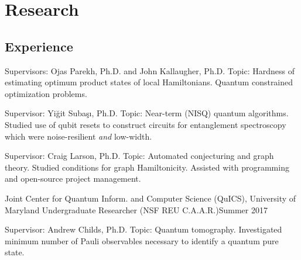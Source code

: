 \documentclass[11pt,letterpaper,serif]{moderncv}
\begin{document}
\section{Research}
\subsection{Experience}
{
	\begin{adjustwidth}{.25in}{}
		Supervisors: Ojas Parekh, Ph.D. and John Kallaugher, Ph.D. \newline
		Topic: Hardness of estimating optimum product states of local Hamiltonians. Quantum constrained optimization problems.
	\end{adjustwidth}
}

{
	\begin{adjustwidth}{.25in}{}
		Supervisor: Yi\u{g}it Suba\c{s}\i, Ph.D. \newline
		Topic: Near-term (NISQ) quantum algorithms. Studied use of qubit resets to construct circuits for entanglement spectroscopy which were noise-resilient \textit{and} low-width.
	\end{adjustwidth}
}

{
	\begin{adjustwidth}{.25in}{}
		Supervisor: Craig Larson, Ph.D. \newline
		Topic: Automated conjecturing and graph theory. Studied conditions for graph Hamiltonicity. Assisted with programming and open-source project management.
	\end{adjustwidth}
}

\cventry{}
{\small Joint Center for Quantum Inform. and Computer Science (QuICS), University of Maryland}
{Undergraduate Researcher (NSF REU C.A.A.R.)}{Summer 2017}{}
{
	\begin{adjustwidth}{.25in}{}
		Supervisor: Andrew Childs, Ph.D. \newline
		Topic: Quantum tomography. Investigated minimum number of Pauli observables necessary to identify a quantum pure state.
	\end{adjustwidth}
}
\end{document}
